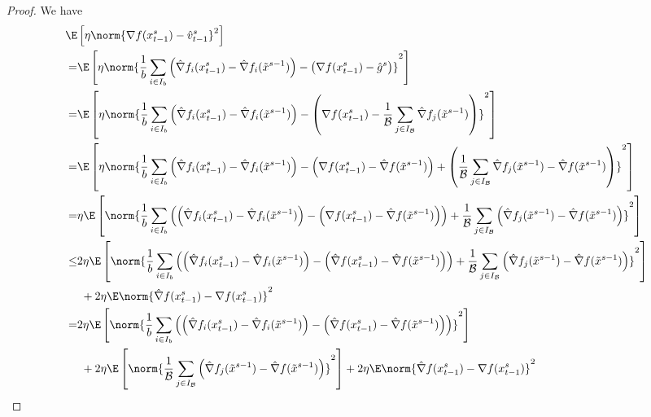 \begin{proof}
We have
\begin{align}
  \E&\left[\eta\norm{\nabla f(x_{t-1}^s)-{\hat{v}_{t-1}^s}}^2\right]\notag\\
   =&\E\left[\eta\norm{\frac{1}{b}\sum_{i\in I_b}\left(\hat{\nabla} f_i(x_{t-1}^s)-\hat{\nabla} f_i(\tilde{x}^{s-1})\right) - \left(\nabla f(x_{t-1}^s)-\hat{g}^s\right)}^2\right]\notag\\
   =&\E\left[\eta\norm{\frac{1}{b}\sum_{i\in I_b}\left(\hat{\nabla} f_i(x_{t-1}^s)-\hat{\nabla} f_i(\tilde{x}^{s-1})\right) - \left(\nabla f(x_{t-1}^s)-\frac{1}{\mathcal{B}}\sum_{j\in I_{\mathcal{B}}}\hat{\nabla} f_j(\tilde{x}^{s-1})\right)}^2\right]\notag\\
   =&\notag\E\left[\eta\norm{\frac{1}{b}\sum_{i\in I_b}\left(\hat{\nabla} f_i(x_{t-1}^s)-\hat{\nabla} f_i(\tilde{x}^{s-1})\right) - \left(\nabla f(x_{t-1}^s) - \hat{\nabla} f(\tilde{x}^{s-1}) \right)+ \left(\frac{1}{\mathcal{B}}\sum_{j\in I_{\mathcal{B}}}\hat{\nabla} f_j(\tilde{x}^{s-1}) - \hat{\nabla} f(\tilde{x}^{s-1})\right)}^2\right]\\
   =&\notag\eta\E\left[\norm{\frac{1}{b}\sum_{i\in I_b}\left(\left(\hat{\nabla} f_i(x_{t-1}^s)-\hat{\nabla} f_i(\tilde{x}^{s-1})\right) - \left(\nabla f(x_{t-1}^s) - \hat{\nabla} f(\tilde{x}^{s-1}) \right)\right)+ \frac{1}{\mathcal{B}}\sum_{j\in I_{\mathcal{B}}}\left(\hat{\nabla} f_j(\tilde{x}^{s-1}) - \hat{\nabla} f(\tilde{x}^{s-1})\right)}^2\right]\\
   \leq &\notag2\eta\E\left[\norm{\frac{1}{b}\sum_{i\in I_b}\left(\left(\hat{\nabla} f_i(x_{t-1}^s)-\hat{\nabla} f_i(\tilde{x}^{s-1})\right) - \left(\hat{\nabla} f(x_{t-1}^s) - \hat{\nabla} f(\tilde{x}^{s-1}) \right)\right)+ \frac{1}{\mathcal{B}}\sum_{j\in I_{\mathcal{B}}}\left(\hat{\nabla} f_j(\tilde{x}^{s-1}) - \hat{\nabla} f(\tilde{x}^{s-1})\right)}^2\right]\\
   &\,\, + 2\eta \E \norm{\hat{\nabla} f(x_{t-1}^s)-\nabla f(x_{t-1}^s)}^2\label{var-estimate-lem-1}\\
    = &\notag 2 \eta\E\left[\norm{\frac{1}{b}\sum_{i\in I_b}\left(\left(\hat{\nabla} f_i(x_{t-1}^s)-\hat{\nabla} f_i(\tilde{x}^{s-1})\right) - \left(\hat{\nabla} f(x_{t-1}^s) - \hat{\nabla} f(\tilde{x}^{s-1}) \right)\right)}^2\right]\\
   &\,\, +2 \eta \E \left[ \norm{\frac{1}{\mathcal{B}}\sum_{j\in I_{\mathcal{B}}}\left(\hat{\nabla} f_j(\tilde{x}^{s-1}) - \hat{\nabla} f(\tilde{x}^{s-1})\right)}^2\right]+ 2\eta \E \norm{\hat{\nabla} f(x_{t-1}^s)-\nabla f(x_{t-1}^s)}^2\label{var-estimate-lem-2}\\

\end{align}
\end{proof}
